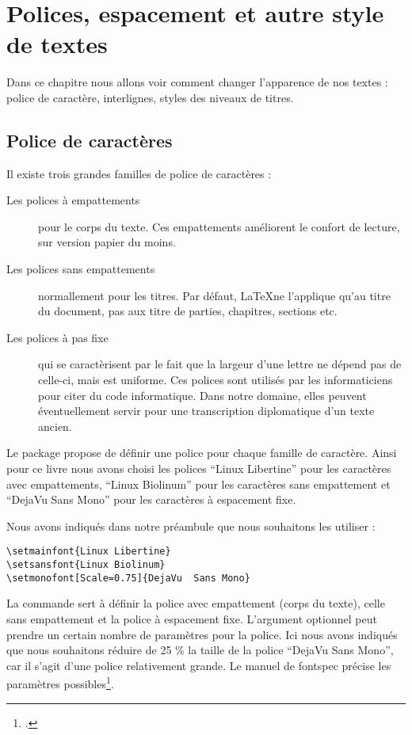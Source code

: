 \chapter{Polices, espacement et autre style de textes}


\begin{prealable}
Dans ce chapitre nous allons voir comment changer l'apparence de nos textes : police de caractère, interlignes, styles des niveaux de titres.  
\end{prealable}

\section{Police de caractères}

Il existe trois grandes familles de police de caractères : 
\begin{description}
\item[Les polices à empattements]pour le corps du texte. Ces empattements améliorent le confort de lecture, sur version papier du moins. 
\item[Les polices sans empattements]normallement pour les titres. Par défaut, \LaTeX ne l'applique qu'au titre du document, pas aux titre de parties, chapitres, sections etc.
\item[Les polices à pas fixe]qui se caractèrisent par le fait que la largeur d'une lettre ne dépend pas de celle-ci, mais est uniforme. Ces polices sont utilisés par les informaticiens pour citer du code informatique. Dans notre domaine, elles peuvent éventuellement servir pour une transcription diplomatique d'un texte ancien.
\end{description}

Le package  propose de définir une police pour chaque famille de caractère. Ainsi pour ce livre nous avons choisi les polices \enquote{Linux Libertine} pour les caractères avec empattements, \enquote{Linux Biolinum} pour les caractères sans empattement et \enquote{DejaVu  Sans Mono} pour les caractères à espacement fixe.

Nous avons indiqués dans notre préambule que nous souhaitons les utiliser :

\begin{verbatim}
\setmainfont{Linux Libertine}
\setsansfont{Linux Biolinum}
\setmonofont[Scale=0.75]{DejaVu  Sans Mono}
\end{verbatim}

La commande  sert à définir la police avec empattement (corps du texte),  celle sans empattement et  la police à espacement fixe. L'argument optionnel peut prendre un certain nombre de paramètres pour la police. Ici nous avons indiqués que nous souhaitons réduire de 25 \% la taille de la police \enquote{DejaVu Sans Mono}, car il s'agit d'une police relativement grande. Le manuel de fontspec précise les paramètres possibles\footcite{fontspec_optionspolices}.

